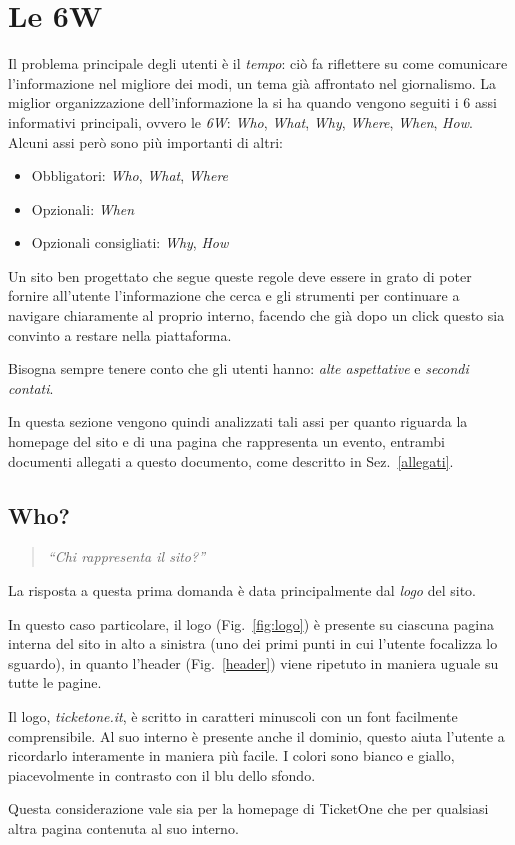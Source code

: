 \section{Le 6W}\label{6w}

Il problema principale degli utenti è il \textit{tempo}: ciò fa riflettere su come comunicare l'informazione nel migliore dei modi, un tema già affrontato nel giornalismo.
La miglior organizzazione dell'informazione la si ha quando vengono seguiti i 6 assi informativi principali, ovvero le \textit{6W}: \textit{Who}, \textit{What}, \textit{Why}, \textit{Where}, \textit{When}, \textit{How}.\\
Alcuni assi però sono più importanti di altri:
\begin{itemize}[noitemsep]
	\item Obbligatori: \textit{Who}, \textit{What}, \textit{Where}
	\item Opzionali: \textit{When}
	\item Opzionali consigliati: \textit{Why}, \textit{How}
\end{itemize}
\par Un sito ben progettato che segue queste regole deve essere in grato di poter fornire all'utente l'informazione che cerca e gli strumenti per continuare a navigare chiaramente al proprio interno, facendo che già dopo un click questo sia convinto a restare nella piattaforma.
\par Bisogna sempre tenere conto che gli utenti hanno: \textit{alte aspettative} e \textit{secondi contati}.
\par In questa sezione vengono quindi analizzati tali assi per quanto riguarda la homepage del sito e di una pagina che rappresenta un evento, entrambi documenti allegati a questo documento, come descritto in Sez.~\ref{allegati}.

\subsection{Who?}
	\begin{quote}
	    \emph{``Chi rappresenta il sito?''}
	\end{quote}
	La risposta a questa prima domanda è data principalmente dal \textit{logo} del sito.
	\par In questo caso particolare, il logo (Fig.~\ref{fig:logo}) è presente su ciascuna pagina interna del sito in alto a sinistra (uno dei primi punti in cui l'utente focalizza lo sguardo), in quanto l'header (Fig.~\ref{header}) viene ripetuto in maniera uguale su tutte le pagine.
	\par Il logo, \textit{ticketone.it}, è scritto in caratteri minuscoli con un font facilmente comprensibile.
	Al suo interno è presente anche il dominio, questo aiuta l'utente a ricordarlo interamente in maniera più facile.
	I colori sono bianco e giallo, piacevolmente in contrasto con il blu dello sfondo.
	\par Questa considerazione vale sia per la homepage di TicketOne che per qualsiasi altra pagina contenuta al suo interno.
	
